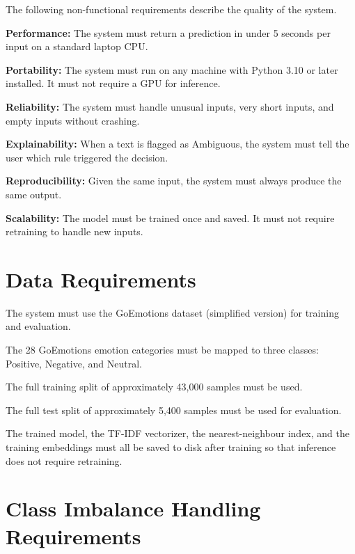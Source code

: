 The following non-functional requirements describe the quality of the system.

\begin{description}[leftmargin=2.5cm, style=nextline]
    \item[NFR1.] \textbf{Performance:} The system must return a prediction in under 5 seconds per input on a standard laptop CPU.
    \item[NFR2.] \textbf{Portability:} The system must run on any machine with Python 3.10 or later installed. It must not require a GPU for inference.
    \item[NFR3.] \textbf{Reliability:} The system must handle unusual inputs, very short inputs, and empty inputs without crashing.
    \item[NFR4.] \textbf{Explainability:} When a text is flagged as Ambiguous, the system must tell the user which rule triggered the decision.
    \item[NFR5.] \textbf{Reproducibility:} Given the same input, the system must always produce the same output.
    \item[NFR6.] \textbf{Scalability:} The model must be trained once and saved. It must not require retraining to handle new inputs.
\end{description}

\section{Data Requirements}

\begin{description}[leftmargin=2.5cm, style=nextline]
    \item[DR1.] The system must use the GoEmotions dataset (simplified version) for training and evaluation.
    \item[DR2.] The 28 GoEmotions emotion categories must be mapped to three classes: Positive, Negative, and Neutral.
    \item[DR3.] The full training split of approximately 43,000 samples must be used.
    \item[DR4.] The full test split of approximately 5,400 samples must be used for evaluation.
    \item[DR5.] The trained model, the TF-IDF vectorizer, the nearest-neighbour index, and the training embeddings must all be saved to disk after training so that inference does not require retraining.
\end{description}

\section{Class Imbalance Handling Requirements}


